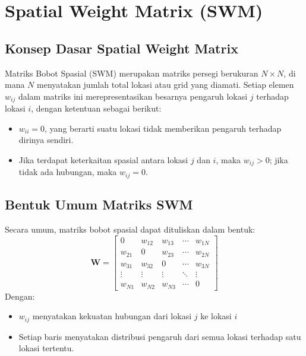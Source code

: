 \section{Spatial Weight Matrix (SWM)}
\subsection{Konsep Dasar Spatial Weight Matrix}
Matriks Bobot Spasial (SWM) merupakan matriks persegi berukuran $N \times N$, di mana $N$ menyatakan jumlah total lokasi atau grid yang diamati. Setiap elemen $w_{ij}$ dalam matriks ini merepresentasikan besarnya pengaruh lokasi $j$ terhadap lokasi $i$, dengan ketentuan sebagai berikut:
\begin{itemize}
    \item $w_{ii} = 0$, yang berarti suatu lokasi tidak memberikan pengaruh terhadap dirinya sendiri.
    \item Jika terdapat keterkaitan spasial antara lokasi $j$ dan $i$, maka $w_{ij}>0$; jika tidak ada hubungan, maka $w_{ij}=0$.
\end{itemize}

\subsection{Bentuk Umum Matriks SWM}
Secara umum, matriks bobot spasial dapat dituliskan dalam bentuk:
\begin{equation}\label{swm}
    \mathbf{W} = 
    \begin{bmatrix}
    0 & w_{12} & w_{13} & \cdots & w_{1N} \\
    w_{21} & 0 & w_{23} & \cdots & w_{2N} \\
    w_{31} & w_{32} & 0 & \cdots & w_{3N} \\
    \vdots & \vdots & \vdots & \ddots & \vdots \\
    w_{N1} & w_{N2} & w_{N3} & \cdots & 0
    \end{bmatrix}
\end{equation}
Dengan:
\begin{itemize}
    \item $w_{ij}$ menyatakan kekuatan hubungan dari lokasi $j$ ke lokasi $i$
    \item Setiap baris menyatakan distribusi pengaruh dari semua lokasi terhadap satu lokasi tertentu.
\end{itemize}

